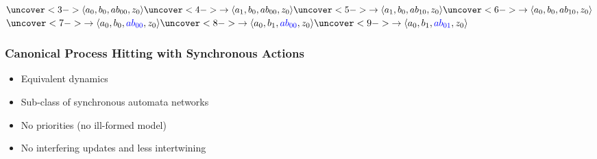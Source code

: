 \begin{frame}[t]

\medskip
$ \uncover<3->{\PHstate{a_0, b_0, ab_{00}, z_0}}
  \uncover<4->{\rightarrow\PHstate{a_1, b_0, ab_{00}, z_0}}
  \uncover<5->{\rightarrow\PHstate{a_1, b_0, ab_{10}, z_0}}
  \uncover<6->{\rightarrow\PHstate{a_0, b_0, ab_{10}, z_0}}$
\\ \qquad
$ \uncover<7->{\rightarrow\PHstate{a_0, b_0, \ex{ab_{00}}, z_0}}
  \uncover<8->{\rightarrow\PHstate{a_0, b_1, \ex{ab_{00}}, z_0}}
  \uncover<9->{\rightarrow\PHstate{a_0, b_1, \ex{ab_{01}}, z_0}}$
\end{frame}



\begin{frame}[t]
  \frametitle{Canonical Process Hitting with Synchronous Actions}

\begin{center}\end{center}

\begin{itemize}
  \item Equivalent dynamics
  \item Sub-class of synchronous automata networks
  \item No priorities (no ill-formed model)
  \item No interfering updates and less intertwining
\end{itemize}

% 
% 
\end{frame}
